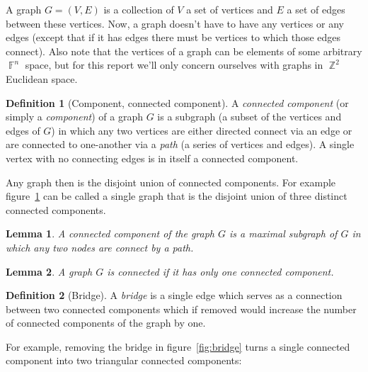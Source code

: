 \documentclass{amsart}
\DeclareMathOperator{\Z}{\mathbb{Z}}
\DeclareMathOperator{\F}{\mathbb{F}}
\theoremstyle{plain}
\newtheorem*{lemma}{Lemma}
\theoremstyle{remark}
\theoremstyle{definition}
\newtheorem*{definition}{Definition}
\begin{document}
A graph $G=(V,E)$ is a collection of $V$ a set of vertices and $E$ a set of
edges between these vertices. Now, a graph doesn't have to have any vertices or
any edges (except that if it has edges there must be vertices to which those edges
connect).
Also note that the vertices of a graph can be elements of some arbitrary $\F^n$
space, but for this report we'll only concern ourselves with graphs in $\Z^2$
Euclidean space.
\begin{definition}[Component, connected component]
  A \emph{connected component} (or simply a \emph{component}) of a graph $G$ is
  a subgraph (a subset of the vertices and edges of $G$) in which any two
  vertices are either directed connect via an edge or are connected to
  one-another via a \emph{path} (a series of vertices and edges). A single
  vertex with no connecting edges is in itself a connected component.
\end{definition}
Any graph then is the disjoint union of connected components.
For example figure~\ref{fig:disjoint-union} can be called a single graph that is the disjoint
union of three distinct connected components.
\begin{figure}[h]
  \caption[Disjoin union]{}
  \label{fig:disjoint-union}
\end{figure}
\begin{lemma}
  A connected component of the graph $G$ is a maximal subgraph of $G$ in which
  any two nodes are connect by a path.
\end{lemma}
\begin{lemma}
  A graph $G$ is \emph{connected} if it has only one connected component.
\end{lemma}
\begin{definition}[Bridge]
  A \emph{bridge} is a single edge which serves as a connection between two connected
  components which if removed would increase the number of connected
  components of the graph by one.
\end{definition}
For example, removing the bridge in figure~\ref{fig:bridge} turns a single
connected component into two triangular connected components:
\end{document}

